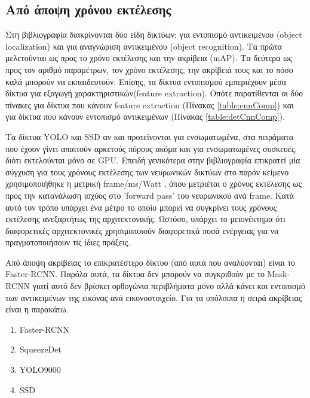 \subsection*{Από άποψη χρόνου εκτέλεσης}

Στη βιβλιογραφία διακρίνονται δύο είδη δικτύων: για εντοπισμό αντικειμένου (object localization) και για αναγνώριση αντικειμένου (object recognition). Τα πρώτα μελετούνται ως προς το χρόνο εκτέλεσης και την ακρίβεια (mAP). Τα δεύτερα ως προς τον αριθμό παραμέτρων, τον χρόνο εκτέλεσης, την ακρίβειά τους και το πόσο καλά μπορούν να εκπαιδευτούν. Επίσης, τα δίκτυα εντοπισμού εμπεριέχουν μέσα δίκτυα για εξαγωγή χαρακτηριστικών(feature extraction). Οπότε παρατίθενται οι δύο πίνακες για δίκτυα που κάνουν feature extraction (Πίνακας \ref{table:cnnComp}) και για δίκτυα που κάνουν εντοπισμό αντικειμένων (Πίνακας \ref{table:detCnnComp}).

Τα δίκτυα YOLO και SSD αν και προτείνονται για ενσωματωμένα, στα πειράματα που έχουν γίνει απαιτούν αρκετούς πόρους ακόμα και για ενσωματωμένες συσκευές, διότι εκτελούνται μόνο σε GPU. Επειδή γενικότερα στην βιβλιογραφία επικρατεί μία σύγχυση για τους χρόνους εκτέλεσης των νευρωνικών δικτύων στο παρόν κείμενο χρησιμοποιήθηκε η μετρική frame/ms/Watt , όπου μετριέται ο χρόνος εκτέλεσης ως προς την κατανάλωση ισχύος στο 'forward pass' του νευρωνικού ανά frame. Κατά αυτό τον τρόπο υπάρχει ένα μέτρο το οποίο μπορεί να συγκρίνει τους χρόνους εκτέλεσης ανεξαρτήτως της αρχιτεκτονικής. Ωστόσο, υπάρχει το μειονέκτημα ότι διαφορετικές αρχιτεκτονικές χρησιμοποιούν διαφορετικά ποσά ενέργειας για να πραγματοποιήσουν τις ίδιες πράξεις.


Από άποψη ακρίβειας το επικρατέστερο δίκτυο (από αυτά που αναλύονται) είναι το Faster-RCNN. Παρόλα αυτά, τα δίκτυα δεν μπορούν να συγκριθούν με το Mask-RCNN γιατί αυτό δεν βρίσκει ορθογώνια περιβλήματα μόνο αλλά κάνει και εντοπισμό των αντικειμένων της εικόνας ανά εικονοστοιχείο. Για τα υπόλοιπα η σειρά ακρίβειας είναι η παρακάτω.
\begin{enumerate}
    \item Faster-RCNN
    \item SqueezeDet
    \item YOLO9000
    \item SSD
\end{enumerate}

